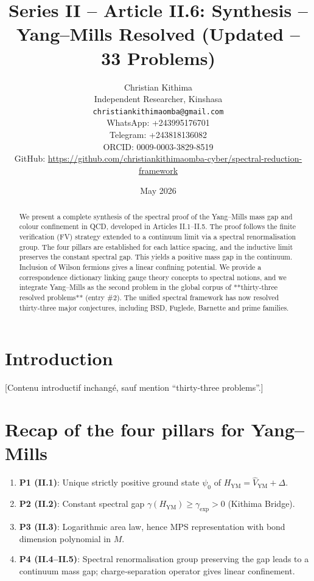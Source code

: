 \documentclass[11pt,a4paper]{article}
\title{Series II – Article II.6: Synthesis – Yang–Mills Resolved (Updated – 33 Problems)}
\author{Christian Kithima \\
Independent Researcher, Kinshasa \\
\texttt{christiankithimaomba@gmail.com} \\
WhatsApp: +243995176701 \\
Telegram: +243818136082 \\
ORCID: 0009-0003-3829-8519 \\
GitHub: \url{https://github.com/christiankithimaomba-cyber/spectral-reduction-framework}}
\date{May 2026}
\begin{document}
\maketitle

\begin{abstract}
We present a complete synthesis of the spectral proof of the Yang–Mills mass gap and colour confinement in QCD, developed in Articles II.1–II.5. The proof follows the finite verification (FV) strategy extended to a continuum limit via a spectral renormalisation group. The four pillars are established for each lattice spacing, and the inductive limit preserves the constant spectral gap. This yields a positive mass gap in the continuum. Inclusion of Wilson fermions gives a linear confining potential. We provide a correspondence dictionary linking gauge theory concepts to spectral notions, and we integrate Yang–Mills as the second problem in the global corpus of **thirty‑three resolved problems** (entry \#2). The unified spectral framework has now resolved thirty‑three major conjectures, including BSD, Fuglede, Barnette and prime families.
\end{abstract}

\tableofcontents

\section{Introduction}

[Contenu introductif inchangé, sauf mention “thirty‑three problems”.]

\section{Recap of the four pillars for Yang–Mills}

\begin{enumerate}
\item \textbf{P1 (II.1)}: Unique strictly positive ground state \(\psi_0\) of \(H_{\mathrm{YM}} = \hat{V}_{\mathrm{YM}} + \Delta\).
\item \textbf{P2 (II.2)}: Constant spectral gap \(\gamma(H_{\mathrm{YM}}) \ge \gamma_{\mathrm{exp}} > 0\) (Kithima Bridge).
\item \textbf{P3 (II.3)}: Logarithmic area law, hence MPS representation with bond dimension polynomial in \(M\).
\item \textbf{P4 (II.4–II.5)}: Spectral renormalisation group preserving the gap leads to a continuum mass gap; charge‑separation operator gives linear confinement.
\end{enumerate}
\end{document}
